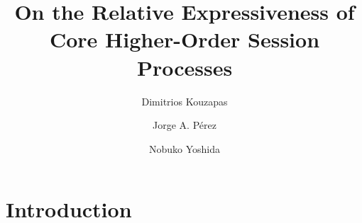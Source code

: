 \documentclass[runningheads]{llncs}
\begin{document}



\title{On the Relative Expressiveness of \\ Core Higher-Order Session Processes}

\author{
	Dimitrios Kouzapas%
	\and
	Jorge A. P\'{e}rez
	\and Nobuko Yoshida
}
\maketitle









%

%

\section{Introduction}
\label{sec:intro}


%




%
\end{document}
